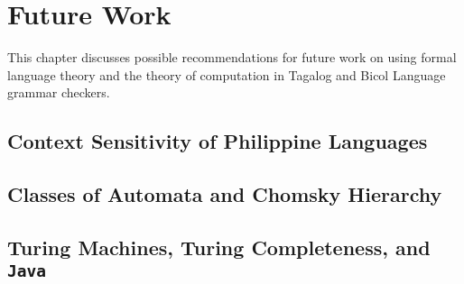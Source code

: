 \chapter{Future Work}
\label{future_work}

This chapter discusses possible recommendations for future work on using formal language theory and the theory of computation in Tagalog and Bicol Language grammar checkers.

\section{Context Sensitivity of Philippine Languages}

\section{Classes of Automata and Chomsky Hierarchy}

\section{Turing Machines, Turing Completeness, and \texttt{Java}}